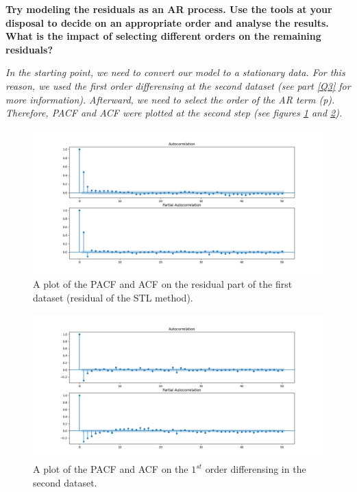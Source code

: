 \item \textbf{Try modeling the residuals as an AR process. Use the tools at your disposal to decide on an appropriate order and analyse the results. What is the impact of selecting different orders on the remaining residuals?}




\textit{In the starting point, we need to convert our model to a stationary data. For this reason, we used the first order differensing at the second dataset (see part \ref{Q3} for more information).}
\textit{Afterward, we need to select the order of the \gls{AR} term (p). Therefore, \gls{PACF} and \gls{ACF} were plotted at the second step (see figures \ref{fig:Ass1_D1_PACF_ACF_X} and \ref{fig:Ass1_D2_PACF_ACF_X}).}  

\begin{figure}[H]
    \centering
    \begin{minipage}[b]{1\textwidth}
        \includegraphics[width=\textwidth]{figures/Ass1/Ass1_D1_PACF_ACF_X.png}
    \end{minipage}
    \caption{A plot of the \gls{PACF} and \gls{ACF} on the residual part of the first dataset (residual of the STL method).}
    \label{fig:Ass1_D1_PACF_ACF_X}
\end{figure}

\begin{figure}[H]
    \centering
    \begin{minipage}[b]{1\textwidth}
        \includegraphics[width=\textwidth]{figures/Ass1/Ass1_D2_PACF_ACF_X.png}
    \end{minipage}
    \caption{A plot of the \gls{PACF} and \gls{ACF} on the $1^{st}$ order differensing in the second dataset.}
    \label{fig:Ass1_D2_PACF_ACF_X}
\end{figure}


